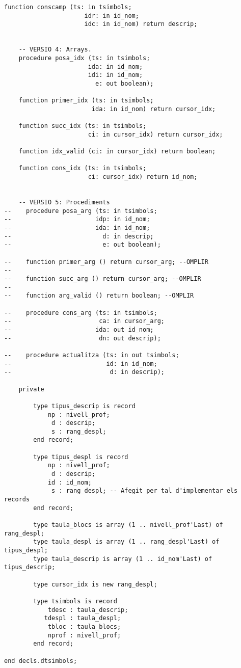 \documentclass[10pt]{report}
\begin{document}
\begin{lstlisting}[style=Ada]
    function conscamp (ts: in tsimbols;
                      idr: in id_nom;
                      idc: in id_nom) return descrip;


    -- VERSIO 4: Arrays.
    procedure posa_idx (ts: in tsimbols;
                       ida: in id_nom;
                       idi: in id_nom;
                         e: out boolean);
                        
    function primer_idx (ts: in tsimbols;
                        ida: in id_nom) return cursor_idx;
                         
    function succ_idx (ts: in tsimbols;
                       ci: in cursor_idx) return cursor_idx;
                             
    function idx_valid (ci: in cursor_idx) return boolean;
    
    function cons_idx (ts: in tsimbols;
                       ci: cursor_idx) return id_nom;
                      
                         
    -- VERSIO 5: Procediments
--    procedure posa_arg (ts: in tsimbols;
--                       idp: in id_nom;
--                       ida: in id_nom;
--                         d: in descrip;
--                         e: out boolean);
                          
--    function primer_arg () return cursor_arg; --OMPLIR
--    
--    function succ_arg () return cursor_arg; --OMPLIR
--    
--    function arg_valid () return boolean; --OMPLIR
    
--    procedure cons_arg (ts: in tsimbols;
--                        ca: in cursor_arg;
--                       ida: out id_nom;
--                        dn: out descrip);
                         
--    procedure actualitza (ts: in out tsimbols;
--                          id: in id_nom;
--                           d: in descrip);
    
    private
    
        type tipus_descrip is record
            np : nivell_prof;
             d : descrip;
             s : rang_despl;
        end record;
        
        type tipus_despl is record
            np : nivell_prof;
             d : descrip;
            id : id_nom;
             s : rang_despl; -- Afegit per tal d'implementar els records
        end record;
         
        type taula_blocs is array (1 .. nivell_prof'Last) of rang_despl;
        type taula_despl is array (1 .. rang_despl'Last) of tipus_despl;
        type taula_descrip is array (1 .. id_nom'Last) of tipus_descrip;
        
        type cursor_idx is new rang_despl;
            
        type tsimbols is record
            tdesc : taula_descrip;
           tdespl : taula_despl;
            tbloc : taula_blocs;
            nprof : nivell_prof;
        end record;

end decls.dtsimbols;
    \end{lstlisting}
    \newpage
    
\end{document}
